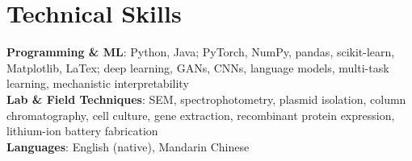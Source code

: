 \documentclass[letterpaper,11pt]{article}
\begin{document}
\section{Technical Skills}
 \begin{itemize}[leftmargin=0.15in, label={}]
    \small{\item{
     \textbf{Programming \& ML}{: Python, Java; PyTorch, NumPy, pandas, scikit-learn, Matplotlib, LaTex; deep learning, GANs, CNNs, language models, multi-task learning, mechanistic interpretability} \\
     \textbf{Lab \& Field Techniques}{: SEM, spectrophotometry, plasmid isolation, column chromatography, cell culture, gene extraction, recombinant protein expression, lithium-ion battery fabrication} \\
     \textbf{Languages}{: English (native), Mandarin Chinese}
    }}
 \end{itemize}


\end{document}
